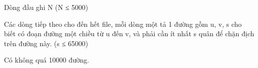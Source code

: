 Dòng đầu ghi N (N ≤ 5000)   


   Các dòng tiếp theo cho đến hết file, mỗi dòng một tả 1 đường gồm u, v, s cho biết có đoạn đường một chiều từ u đến v, và phải cần ít nhất s quân để chặn địch trên đường này. (s ≤ 65000)   


   Có không quá 10000 đường.